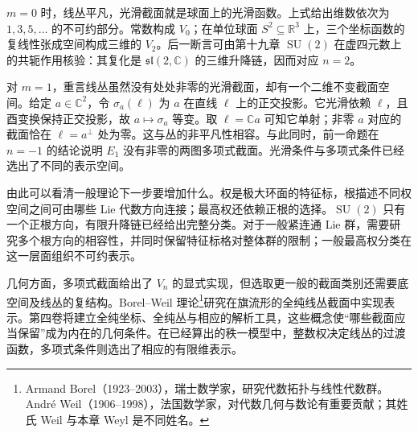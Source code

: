 \begin{example}\label{g1:exm:sphere-sections-smooth-polynomial}
	\(m=0\) 时，线丛平凡，光滑截面就是球面上的光滑函数。上式给出维数依次为 \(1,3,5,\ldots\) 的不可约部分。常数构成 \(V_0\)；在单位球面 \(S^2\subseteq\mathbb R^3\) 上，三个坐标函数的复线性张成空间构成三维的 \(V_2\)。后一断言可由第十九章 \(\operatorname{SU}(2)\) 在虚四元数上的共轭作用核验：其复化是 \(\mathfrak{sl}(2,\mathbb C)\) 的三维升降链，因而对应 \(n=2\)。

	对 \(m=1\)，重言线丛虽然没有处处非零的光滑截面，却有一个二维不变截面空间。给定 \(a\in\mathbb C^2\)，令 \(\sigma_a(\ell)\) 为 \(a\) 在直线 \(\ell\) 上的正交投影。它光滑依赖 \(\ell\)，且酉变换保持正交投影，故 \(a\mapsto\sigma_a\) 等变。取 \(\ell=\mathbb Ca\) 可知它单射；非零 \(a\) 对应的截面恰在 \(\ell=a^\perp\) 处为零。这与丛的非平凡性相容。与此同时，前一命题在 \(n=-1\) 的结论说明 \(E_1\) 没有非零的两图多项式截面。光滑条件与多项式条件已经选出了不同的表示空间。
\end{example}

由此可以看清一般理论下一步要增加什么。权是极大环面的特征标，根描述不同权空间之间可由哪些 Lie 代数方向连接；最高权还依赖正根的选择。\(\operatorname{SU}(2)\) 只有一个正根方向，有限升降链已经给出完整分类。对于一般紧连通 Lie 群，需要研究多个根方向的相容性，并同时保留特征标格对整体群的限制；一般最高权分类在这一层面组织不可约表示。

\ProseParagraphBreak

几何方面，多项式截面给出了 \(V_n\) 的显式实现，但选取更一般的截面类别还需要底空间及线丛的复结构。Borel--Weil 理论\footnote{Armand Borel（1923--2003），瑞士数学家，研究代数拓扑与线性代数群。André Weil（1906--1998），法国数学家，对代数几何与数论有重要贡献；其姓氏 Weil 与本章 Weyl 是不同姓名。}研究在旗流形的全纯线丛截面中实现表示。第四卷将建立全纯坐标、全纯丛与相应的解析工具，这些概念使“哪些截面应当保留”成为内在的几何条件。在已经算出的秩一模型中，整数权决定线丛的过渡函数，多项式条件则选出了相应的有限维表示。

